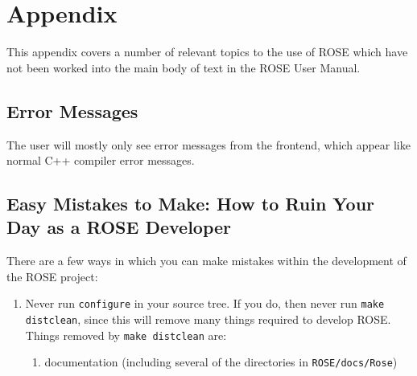 
\chapter{ Appendix }

% 

   This appendix covers a number of relevant topics to the use of ROSE
which have not been worked into the main body of text in the ROSE User Manual.


\section {Error Messages}

   The user will mostly only see error messages from the frontend, which
appear like normal C++ compiler error messages.

\section{Easy Mistakes to Make: How to Ruin Your Day as a ROSE Developer}

   There are a few ways in which you can make mistakes within the development of
the ROSE project:

\begin{enumerate}
     \item Never run {\tt configure} in your source tree.  If you do, then never run 
     {\tt make distclean}, since this will remove many things required to develop 
     ROSE. Things removed by {\tt make distclean} are:
     \begin{enumerate}
          \item documentation (including several of the directories in {\tt ROSE/docs/Rose})
     \end{enumerate}
\end{enumerate}

